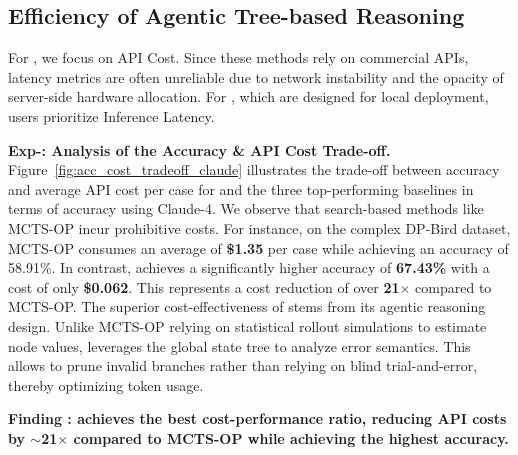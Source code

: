 \subsection{Efficiency of Agentic Tree-based Reasoning}
\label{subsec:efficiency_analysis}




For \sys, we focus on API Cost. Since these methods rely on commercial APIs, latency metrics are often unreliable due to network instability and the opacity of server-side hardware allocation.
For \sys, which are designed for local deployment, users prioritize Inference Latency.

\noindent \textbf{Exp-\expnum\label{exp:acc_cost_tradeoff}: Analysis of the Accuracy \& API Cost Trade-off.}
Figure~\ref{fig:acc_cost_tradeoff_claude} illustrates the trade-off between accuracy and average API cost per case for \sys and the three top-performing baselines in terms of accuracy using Claude-4.
We observe that search-based methods like MCTS-OP incur prohibitive costs. For instance, on the complex DP-Bird dataset, MCTS-OP consumes an average of \textbf{\$1.35} per case while achieving an accuracy of 58.91\%.
In contrast, \sys achieves a significantly higher accuracy of \textbf{67.43\%} with a cost of only \textbf{\$0.062}.
This represents a cost reduction of over \textbf{21$\times$} compared to MCTS-OP.
The superior cost-effectiveness of \sys stems from its agentic reasoning design.
Unlike MCTS-OP relying on statistical rollout simulations to estimate node values, \sys leverages the global state tree to analyze error semantics.
This allows \sys to prune invalid branches rather than relying on blind trial-and-error, thereby optimizing token usage.

\begin{shaded}
\noindent \textbf{Finding \findingnum: \sys achieves the best cost-performance ratio, reducing API costs by $\sim$21$\times$ compared to MCTS-OP while achieving the highest accuracy.}
\end{shaded}

